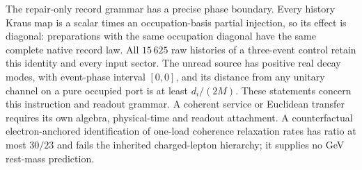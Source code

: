 The repair-only record grammar has a precise phase boundary. Every
history Kraus map is a scalar times an occupation-basis partial injection,
so its effect is diagonal: preparations with the same occupation diagonal
have the same complete native record law. All $15\,625$ raw histories of
a three-event control retain this identity and every input sector.
The unread source has positive real decay modes, with event-phase interval
$[0,0]$, and its distance from any unitary channel on a pure occupied port
is at least $d_i/(2M)$. These statements concern this instruction and
readout grammar. A coherent service or Euclidean transfer requires its
own algebra, physical-time and readout attachment. A counterfactual
electron-anchored identification of one-load coherence relaxation rates
has ratio at most $30/23$ and fails the inherited charged-lepton
hierarchy; it supplies no GeV rest-mass prediction.

